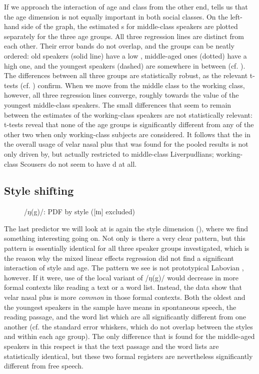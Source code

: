 If we approach the interaction of age and class from the other end,  tells us that the age dimension is not equally important in both social classes.
On the left-hand side of the graph, the estimated s for middle-class speakers are plotted separately for the three age groups.
All three regression lines are distinct from each other.
Their error bands do not overlap, and the groups can be neatly ordered: old speakers (solid line) have a low , middle-aged ones (dotted) have a high one, and the youngest speakers (dashed) are somewhere in between (cf. ).
The differences between all three groups are statistically robust, as the relevant t-tests (cf. ) confirm.
When we move from the middle class to the working class, however, all three regression lines converge, roughly towards the value of the youngest middle-class speakers.
The small differences that seem to remain between the estimates of the working-class speakers are not statistically relevant: t-tests reveal that none of the age groups is significantly different from any of the other two when only working-class subjects are considered.
It follows that the  in the overall usage of velar nasal plus that was found for the pooled results is not only driven by, but actually restricted to middle-class Liverpudlians; working-class Scousers do not seem to have d at all.

\subsection{Style shifting}
\label{sec.prod.res.con.ng.shifting}

\begin{figure}
	
		\resizebox{0.5\linewidth}{!}{} 
	\caption{/ŋ(g)/: PDF by style ([ɪn] excluded)}
	\label{fig.line.ng.tot}
\end{figure}

The last predictor we will look at is again the style dimension (), where we find something interesting going on.
Not only is there a very clear pattern, but this pattern is essentially identical for all three speaker groups investigated, which is the reason why the mixed linear effects regression did not find a significant interaction of style and age.
The pattern we see is not prototypical Labovian , however.
If it were, use of the local variant of /ŋ(g)/ would decrease in more formal contexts like reading a text or a word list.
Instead, the data show that velar nasal plus is more \emph{common} in those formal contexts.
Both the oldest and the youngest speakers in the sample have means in spontaneous speech, the reading passage, and the word list which are all significantly different from one another (cf. the standard error whiskers, which do not overlap between the styles and within each age group).
The only difference that is found for the middle-aged speakers in this respect is that the text passage and the word lists are statistically identical, but these two formal registers are nevertheless significantly different from free speech.

